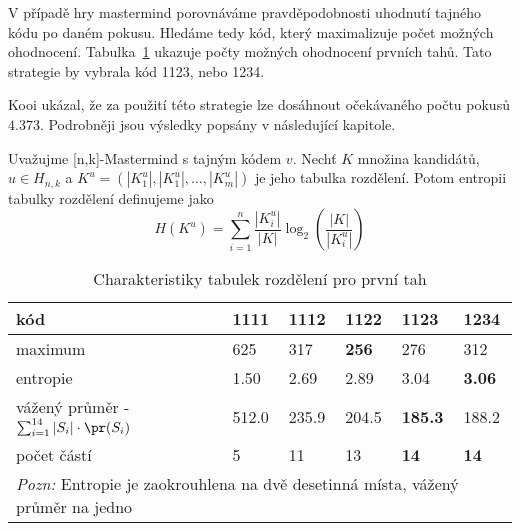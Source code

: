 V případě hry mastermind porovnáváme pravděpodobnosti uhodnutí tajného kódu po daném pokusu. Hledáme tedy kód, který maximalizuje počet možných ohodnocení. Tabulka~\ref{tab02} ukazuje počty možných ohodnocení prvních tahů. Tato strategie by vybrala kód 1123, nebo 1234. 

Kooi ukázal, že za použití této strategie lze dosáhnout očekávaného počtu pokusů $4.373$. Podrobněji jsou výsledky popsány v následující kapitole.



\begin{definice}\label{defentropietabrozdel}
  Uvažujme [n,k]-Mastermind s tajným kódem $v$. Nechť $K$ množina kandidátů, $u \in H_{n,k}$ a $K^u = (|K^u_1|, |K^u_1|, \dots, |K^u_m|)$ je jeho tabulka rozdělení. Potom entropii tabulky rozdělení definujeme jako
  \[H(K^u) = \sum_{i=1}^n \frac{|K^u_i|}{|K|}\log_2\left( \frac{|K|}{|K^u_i|} \right)\]
\end{definice}



\begin{table}[h]
\centering
\begin{tabular}{l l l l l l}
\toprule
kód & 1111 & 1112 & 1122 & 1123 & 1234 \\
\midrule

maximum & 625 & 317 & \textbf{256} & 276 & 312 \\
entropie & 1.50 & 2.69 & 2.89 & 3.04 & \textbf{3.06}\\


vážený průměr - $\sum_{i = 1}^{14} |S_i|  \cdot \pr (S_i)$
& 512.0 & 235.9 & 204.5 & \textbf{185.3} & 188.2 \\


počet částí & 5 & 11 & 13 & \textbf{14} & \textbf{14} \\

\bottomrule
\multicolumn{6}{l}{\footnotesize \textit{Pozn:}
Entropie je zaokrouhlena na dvě desetinná místa, vážený průměr na jedno}
\end{tabular}
\caption{Charakteristiky tabulek rozdělení pro první tah}\label{tab02}
\end{table}

